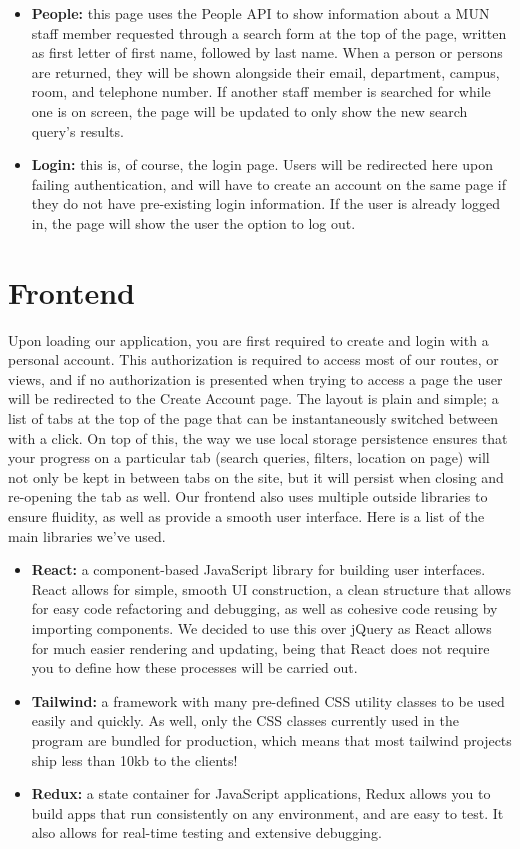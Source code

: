 \documentclass[12pt]{article}
\begin{document}
\begin{itemize}
    \item \textbf{People:} this page uses the People API to show information about a MUN staff member requested through a search form at the top of the page, written as first letter of first name, followed by last name. When a person or persons are returned, they will be shown alongside their email, department, campus, room, and telephone number. If another staff member is searched for while one is on screen, the page will be updated to only show the new search query's results.
    \item \textbf{Login:} this is, of course, the login page. Users will be redirected here upon failing authentication, and will have to create an account on the same page if they do not have pre-existing login information. If the user is already logged in, the page will show the user the option to log out.
\end{itemize}

\section{Frontend}

Upon loading our application, you are first required to create and login with a personal account. This authorization is required to access most of our routes, or views, and if no authorization is presented when trying to access a page the user will be redirected to the Create Account page. The layout is plain and simple; a list of tabs at the top of the page that can be instantaneously switched between with a click. On top of this, the way we use local storage persistence ensures that your progress on a particular tab (search queries, filters, location on page) will not only be kept in between tabs on the site, but it will persist when closing and re-opening the tab as well.
	Our frontend also uses multiple outside libraries to ensure fluidity, as well as provide a smooth user interface. Here is a list of the main libraries we’ve used.
\begin{itemize}
\item \textbf{React:} a component-based JavaScript library for building user interfaces. React allows for simple, smooth UI construction, a clean structure that allows for easy code refactoring and debugging, as well as cohesive code reusing by importing components. We decided to use this over jQuery as React allows for much easier rendering and updating, being that React does not require you to define how these processes will be carried out.

\item \textbf{Tailwind:} a framework with many pre-defined CSS utility classes to be used easily and quickly. As well, only the CSS classes currently used in the program are bundled for production, which means that most tailwind projects ship less than 10kb to the clients!

\item \textbf{Redux:} a state container for JavaScript applications, Redux allows you to build apps that run consistently on any environment, and are easy to test. It also allows for real-time testing and extensive debugging.
\end{itemize}
\end{document}
